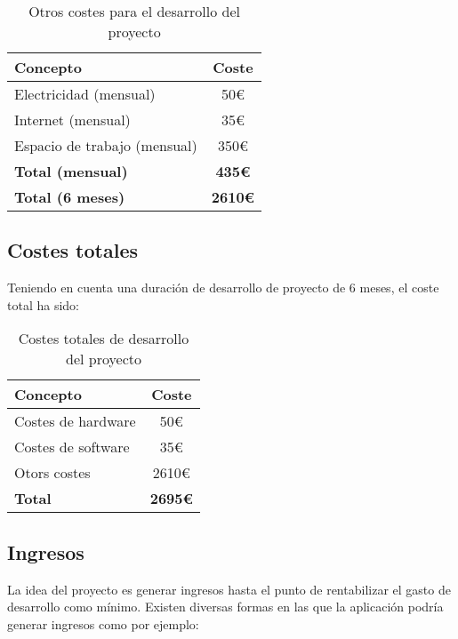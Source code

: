 \begin{table}[h]
\centering
\begin{tabular}{|l|c|}
\hline
\textbf{Concepto} & \textbf{Coste} \\
\hline
Electricidad (mensual) & 50€ \\
Internet (mensual) & 35€ \\
Espacio de trabajo (mensual) & 350€ \\
\hline
\textbf{Total (mensual)} & \textbf{435€} \\
\hline
\textbf{Total (6 meses)} & \textbf{2610€} \\
\hline
\end{tabular}
\caption{Otros costes para el desarrollo del proyecto}
\end{table}

\subsection{Costes totales}
Teniendo en cuenta una duración de desarrollo de proyecto de 6 meses, el coste total ha sido:

\begin{table}[h]
\centering
\begin{tabular}{|l|c|}
\hline
\textbf{Concepto} & \textbf{Coste} \\
\hline
Costes de hardware & 50€ \\
Costes de software & 35€ \\
Otors costes & 2610€ \\
\hline
\textbf{Total} & \textbf{2695€} \\
\hline
\end{tabular}
\caption{Costes totales de desarrollo del proyecto}
\end{table}

\subsection{Ingresos}
La idea del proyecto es generar ingresos hasta el punto de rentabilizar el gasto de desarrollo como mínimo. 
Existen diversas formas en las que la aplicación podría generar ingresos como por ejemplo:


